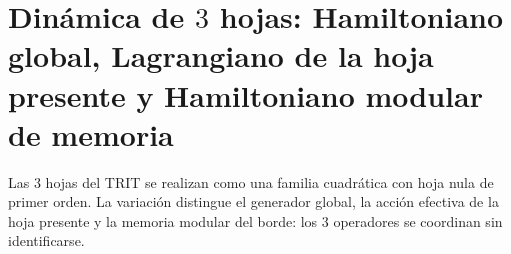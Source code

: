\chapter{Dinámica de \texorpdfstring{\(3\)}{3} hojas: Hamiltoniano global, Lagrangiano de la hoja presente y Hamiltoniano modular de memoria}
\label{chap:md-dinamica-tres-hojas-definitiva}
Las \(3\) hojas del TRIT se realizan como una familia cuadrática con hoja
nula de primer orden. La variación distingue el generador global, la acción
efectiva de la hoja presente y la memoria modular del borde: los \(3\)
operadores se coordinan sin identificarse.
\begin{HMTScientificOwnerSubordinated}

\end{HMTScientificOwnerSubordinated}
\begingroup
\let\HMTOwnerSection\section
\let\HMTOwnerSubsection\subsection
\let\HMTOwnerSubsubsection\subsubsection
\let\HMTOwnerParagraph\paragraph
\let\chapter\HMTOwnerSection
\let\section\HMTOwnerSubsection
\let\subsection\HMTOwnerSubsubsection
\let\subsubsection\HMTOwnerParagraph

\endgroup


